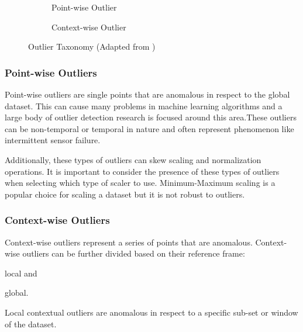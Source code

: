 
\begin{figure}[H]
     \centering
     \begin{subfigure}[b]{0.475\textwidth}
         \centering
         {\resizebox{\textwidth}{!}{}}
         \caption{Point-wise Outlier}
         \label{fig:point}
     \end{subfigure}
     \hfill
     \begin{subfigure}[b]{0.475\textwidth}
         \centering
          {\resizebox{\textwidth}{!}{}}
         \caption{Context-wise Outlier}
         \label{fig:contextual}
     \end{subfigure}
        \caption{Outlier Taxonomy (Adapted from \cite{lai2021revisiting})}
        \label{fig:outliers-graphic}
\end{figure}

\subsubsection{Point-wise Outliers}

Point-wise outliers are single points that are anomalous in respect to the global dataset. This can cause many problems in machine learning algorithms and a large body of outlier detection research is focused around this area.These outliers can be non-temporal or temporal in nature and often represent phenomenon like intermittent sensor failure.

Additionally, these types of outliers can skew scaling and normalization operations. It is important to consider the presence of these types of outliers when selecting which type of scaler to use. Minimum-Maximum scaling is a popular choice for scaling a dataset but it is not robust to outliers.

\subsubsection{Context-wise Outliers}

Context-wise outliers represent a series of points that are anomalous. Context-wise outliers can be further divided based on their reference frame:
\begin{inlinelist}
    \item local and
    \item global.
\end{inlinelist}
Local contextual outliers are anomalous in respect to a specific sub-set or window of the dataset.

